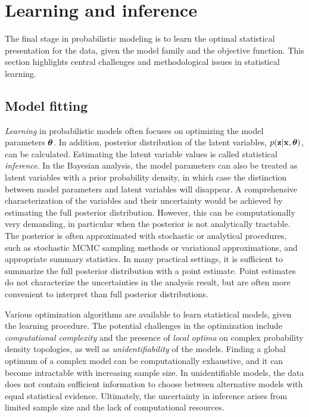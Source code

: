 \section{Learning and inference}\label{sec:learning}

The final stage in probabilistic modeling is to learn the optimal
statistical presentation for the data, given the model family and the
objective function. This section highlights central challenges and
methodological issues in statistical learning. 

\subsection{Model fitting}\label{sec:fitting}

{\it Learning} in probabilistic models often focuses on optimizing the
model parameters \(\boldsymbol{\theta}\). In addition, posterior distribution of the
latent variables, \(p(\mathbf{z}|\mathbf{x}, \boldsymbol{\theta})\), can be calculated. Estimating
the latent variable values is called statistical {\it inference}. In
the Bayesian analysis, the model parameters can also be treated as
latent variables with a prior probability density, in which case the
distinction between model parameters and latent variables will
disappear.  A comprehensive characterization of the variables and
their uncertainty would be achieved by estimating the full posterior
distribution. However, this can be computationally very demanding, in
particular when the posterior is not analytically tractable.  The
posterior is often approximated with stochastic or analytical
procedures, such as stochastic MCMC sampling methods or variational
approximations, and appropriate summary statistics. In many practical
settings, it is sufficient to summarize the full posterior
distribution with a point estimate. Point estimates do not
characterize the uncertainties in the analysis result, but are often
more convenient to interpret than full posterior distributions.

Various optimization algorithms are available to learn statistical
models, given the learning procedure. The potential challenges in the
optimization include {\it computational complexity} and the presence
of {\it local optima} on complex probability density topologies, as
well as {\it unidentifiability} of the models. Finding a global
optimum of a complex model can be computationally exhaustive, and it
can become intractable with increasing sample size. In unidentifiable
models, the data does not contain sufficient information to choose
between alternative models with equal statistical
evidence. Ultimately, the uncertainty in inference arises from limited
sample size and the lack of computational resources.

